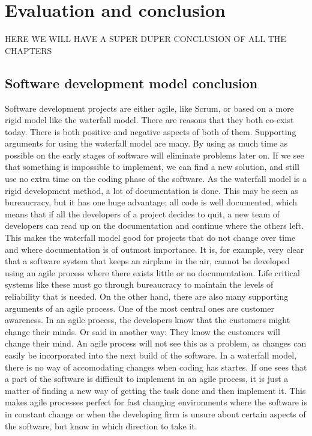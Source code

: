 \section{Evaluation and conclusion}

HERE WE WILL HAVE A SUPER DUPER CONCLUSION OF ALL THE CHAPTERS



\subsection{Software development model conclusion}
Software development projects are either agile, like Scrum,  or based on a more rigid model like the waterfall model. There are reasons that they both co-exist today. There is both positive and negative aspects of both of them. 
\newline
\newline
Supporting arguments for using the waterfall model are many. By using as much time as possible on the early stages of software will eliminate problems later on. If we see that something is impossible to implement, we can find a new solution, and still use no extra time on the coding phase of the software. 
\newline
\newline
As the waterfall model is a rigid development method, a lot of documentation is done. This may be seen as bureaucracy, but it has one huge advantage; all code is well documented, which means that if all the developers of a project decides to quit, a new team of developers can read up on the documentation and continue where the others left. This makes the waterfall model good for projects that do not change over time and where documentation is of outmost importance. It is, for example, very clear that a software system that keeps an airplane in the air, cannot be developed using an agile process where there exists little or no documentation. Life critical systems like these must go through bureaucracy to maintain the levels of reliability that is needed. 
\newline
\newline
On the other hand, there are also many supporting arguments of an agile process. One of the most central ones are customer awareness. In an agile process, the developers know that the customers might change their minds. Or said in another way: They know the customers will change their mind. An agile process will not see this as a problem, as changes can easily be incorporated into the next build of the software. In a waterfall model, there is no way of accomodating changes when coding has startes. If one sees that a part of the software is difficult to implement in an agile process, it is just a matter of finding a new way of getting the task done and then implement it.  This makes agile processes perfect for fast changing environments where the software is in constant change or when the developing firm is unsure about certain aspects of the software, but know in which direction to take it.  
